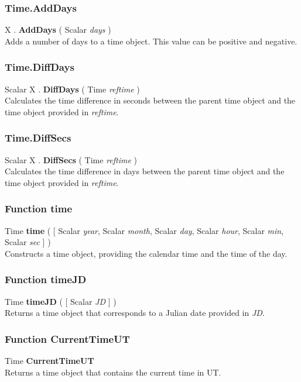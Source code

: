 \documentclass[10pt]{book}
\newcommand{\var}[1]{\textit{#1}}
\begin{document}
\subsubsection{Time.AddDays \label{F:Time:AddDays}}
X . \textbf{AddDays} ( Scalar \textit{days} ) \\
Adds a number of days to a time object. This value can be positive and negative.

\subsubsection{Time.DiffDays \label{F:Time:DiffDays}}
Scalar X . \textbf{DiffDays} ( Time \textit{reftime} ) \\
Calculates the time difference in seconds between the parent time object and the time object provided in \var{reftime}.

\subsubsection{Time.DiffSecs \label{F:Time:DiffSecs}}
Scalar X . \textbf{DiffSecs} ( Time \textit{reftime} ) \\
Calculates the time difference in days between the parent time object and the time object provided in \var{reftime}.


\subsubsection{Function time \label{F:time}}
Time \textbf{time} (  [ Scalar \textit{year}, Scalar \textit{month}, Scalar \textit{day}, Scalar \textit{hour}, Scalar \textit{min}, Scalar \textit{sec} ] ) \\
Constructs a time object, providing the calendar time and the time of the day.

\subsubsection{Function timeJD \label{F:timeJD}}
Time \textbf{timeJD} (  [ Scalar \textit{JD} ] ) \\
Returns a time object that corresponds to a Julian date provided in \var{JD}.

\subsubsection{Function CurrentTimeUT \label{F:CurrentTimeUT}}
Time \textbf{CurrentTimeUT} \\
Returns a time object that contains the current time in UT.
\end{document}
